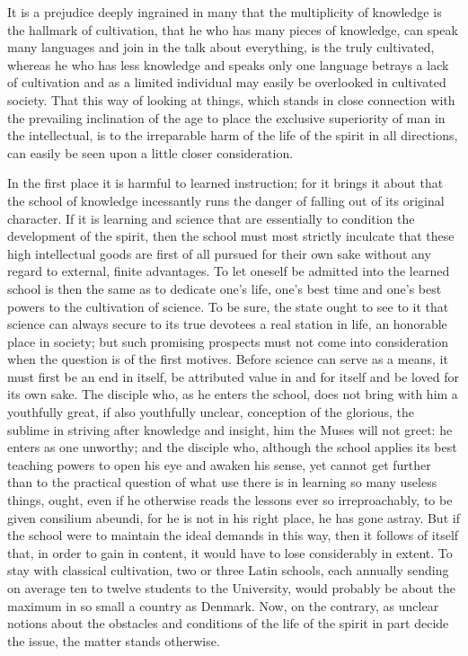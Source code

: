 \documentclass[12pt,a4paper,openany]{book}
\newcommand{\opage}[1]{\marginnote{\footnotesize\textit{[#1]}}}
\begin{document}
It is a prejudice deeply ingrained in many that the
multiplicity of knowledge is the hallmark of cultivation,
that he who has many pieces of knowledge, can speak many
languages and join in the talk about everything, is the truly cultivated, whereas
he who has less knowledge and speaks only one
language betrays a lack of cultivation and as a limited
individual may easily be overlooked in cultivated society.
That this way of looking at things, which stands in close connection
with the prevailing inclination of the age to
\setcounter{footnote}{0}%
\opage{305}place the exclusive superiority of man in the intellectual,
is to the irreparable harm of the life of the spirit in all directions,
can easily be seen upon a little closer consideration.

In the first place it is harmful to learned instruction;
for it brings it about that the school of knowledge incessantly
runs the danger of falling out of its original character.
If it is learning and science that are essentially to condition
the development of the spirit, then the school must most strictly
inculcate that these high intellectual goods are first of all
pursued for their own sake without any
regard to external, finite advantages. To let
oneself be admitted into the learned school is then the same as to
dedicate one's life, one's best time and one's best powers to
the cultivation of science. To be sure, the state ought to see to it
that science can always secure
to its true devotees a real station in life, an honorable
place in society; but such promising prospects must not
come into consideration when the question is of the first
motives. Before science can serve as a means,
it must first be an end in itself, be attributed value
in and for itself and be loved for its own sake. The
disciple who, as he enters the school, does not bring with him
a youthfully great, if also youthfully unclear,
conception of the glorious, the sublime in striving
after knowledge and insight, him the Muses will not greet:
he enters as one unworthy; and the disciple who,
although the school applies its best teaching powers to
open his eye and awaken his sense, yet cannot
get further than to the practical question of what
use there is in learning so many useless things,
ought, even if he otherwise reads the lessons ever so
\setcounter{footnote}{0}%
\opage{306}irreproachably, to be given consilium abeundi, for he is
not in his right place, he has gone astray. But if
the school were to maintain the ideal demands in this way,
then it follows of itself that, in order to
gain in content, it would have to lose considerably in extent. To
stay with classical cultivation, two or three
Latin schools, each annually sending on average ten to twelve
students to the University, would probably be about the maximum
in so small a country as Denmark. Now, on the contrary, as unclear
notions about the obstacles and conditions of the life of the spirit
in part decide the issue, the matter stands otherwise.
\end{document}

